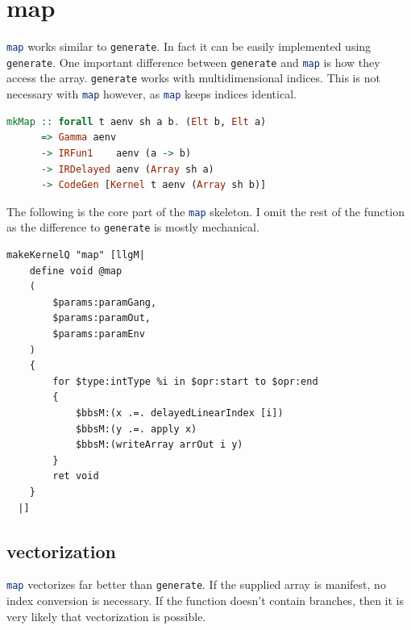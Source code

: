 \documentclass[a4paper,bibliography=totocnumbered,parskip,headsepline]{scrbook}
\begin{document}
\section{map}
\lstinline[language=haskell]!map! works similar to \lstinline[language=haskell]!generate!.
In fact it can be easily implemented using \lstinline[language=haskell]!generate!.
One important difference between \lstinline[language=haskell]!generate! and \lstinline[language=haskell]!map! is how they access the array.
\lstinline[language=haskell]!generate! works with multidimensional indices.
This is not necessary with \lstinline[language=haskell]!map! however, as \lstinline[language=haskell]!map! keeps indices identical.

\begin{lstlisting}[language=haskell]
mkMap :: forall t aenv sh a b. (Elt b, Elt a)
      => Gamma aenv
      -> IRFun1    aenv (a -> b)
      -> IRDelayed aenv (Array sh a)
      -> CodeGen [Kernel t aenv (Array sh b)]
\end{lstlisting}
The following is the core part of the \lstinline[language=haskell]!map! skeleton.
I omit the rest of the function as the difference to \lstinline[language=haskell]!generate! is mostly mechanical.
\begin{lstlisting}
makeKernelQ "map" [llgM|
    define void @map
    (
        $params:paramGang,
        $params:paramOut,
        $params:paramEnv
    )
    {
        for $type:intType %i in $opr:start to $opr:end
        {
            $bbsM:(x .=. delayedLinearIndex [i])
            $bbsM:(y .=. apply x)
            $bbsM:(writeArray arrOut i y)
        }
        ret void
    }
  |]
\end{lstlisting}

\subsection{vectorization}
\lstinline[language=haskell]!map! vectorizes far better than \lstinline[language=haskell]!generate!.
If the supplied array is manifest, no index conversion is necessary.
If the function doesn't contain branches, then it is very likely that vectorization is possible.
\end{document}
